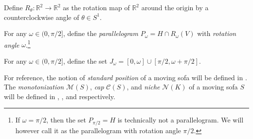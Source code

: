 \begin{definition}

Define \(R_\theta : \mathbb{R}^2 \to \mathbb{R}^2\) as the rotation map of \(\mathbb{R}^2\) around the origin by a counterclockwise angle of \(\theta \in S^1\).

\label{def:rotation-map}
\end{definition}

\begin{definition}

For any \(\omega \in (0, \pi/2]\), define the \emph{parallelogram} \(P_\omega = H \cap R_\omega(V)\) with \emph{rotation angle} \(\omega\).\footnote{If \(\omega = \pi/2\), then the set \(P_{\pi/2} = H\) is technically not a parallelogram. We will however call it as the parallelogram with rotation angle \(\pi/2\).}

\label{def:parallelogram}
\end{definition}

\begin{definition}

For any \(\omega \in (0, \pi/2]\), define the set \(J_\omega = [0, \omega] \cup [\pi/2, \omega + \pi/2]\).

\label{def:j-cap}
\end{definition}

For reference, the notion of \emph{standard position} of a moving sofa will be defined in . The \emph{monotonization} \(\mathcal{M}(S)\), \emph{cap} \(\mathcal{C}(S)\), and \emph{niche} \(\mathcal{N}(K)\) of a moving sofa \(S\) will be defined in , , and  respectively.
